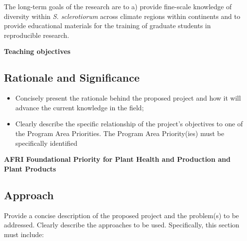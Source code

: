 \documentclass[12pt,letterpaper]{article}
\begin{document}
The long-term goals of the research are to a) provide fine-scale knowledge of diversity within \textit{S. sclerotiorum} across climate regions within continents and to provide educational materials for the training of graduate students in reproducible research. 

\noindent \textbf{Teaching objectives}


\subsection{Rationale and Significance}

\begin{itemize}
  \item Concisely present the rationale behind the proposed project and how it will
  advance the current knowledge in the field;

  \item Clearly describe the specific relationship of the project's objectives to
  one of the Program Area Priorities. The Program Area Priority(ies) must be
  specifically identified
\end{itemize}


\textbf{AFRI Foundational Priority for Plant Health and Production and Plant Products}



\subsection{Approach}


Provide a concise description of the proposed project and the problem(s) to be
addressed. Clearly describe the approaches to be used. Specifically, this
section must include:
\end{document}
